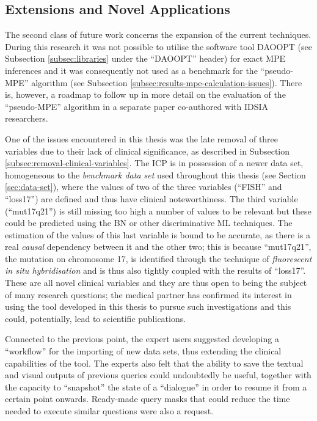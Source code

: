 \subsection{Extensions and Novel Applications}
The second class of future work concerns the expansion of the current techniques.
During this research it was not possible to utilise the software tool DAOOPT (see Subsection \ref{subsec:libraries} under the \enquote{DAOOPT} header) for exact MPE inferences and it was consequently not used as a benchmark for the \enquote{pseudo-MPE} algorithm (see Subsection \ref{subsec:results-mpe-calculation-issues}).
There is, however, a roadmap to follow up in more detail on the evaluation of the \enquote{pseudo-MPE} algorithm in a separate paper co-authored with IDSIA researchers.

One of the issues encountered in this thesis was the late removal of three variables due to their lack of clinical significance, as described in Subsection \ref{subsec:removal-clinical-variables}.
The ICP is in possession of a newer data set, homogeneous to the \textit{benchmark data set} used throughout this thesis (see Section \ref{sec:data-set}), where the values of two of the three variables (\enquote{FISH} and \enquote{loss17}) are defined and thus have clinical noteworthiness.
The third variable (\enquote{mut17q21}) is still missing too high a number of values to be relevant but these could be predicted using the BN or other discriminative ML techniques.
The estimation of the values of this last variable is bound to be accurate, as there is a real \textit{causal} dependency between it and the other two; this is because \enquote{mut17q21}, the mutation on chromosome 17, is identified through the technique of \textit{fluorescent in situ hybridisation} and is thus also tightly coupled with the results of \enquote{loss17}.
These are all novel clinical variables and they are thus open to being the subject of many research questions; the medical partner has confirmed its interest in using the tool developed in this thesis to pursue such investigations and this could, potentially, lead to scientific publications.

Connected to the previous point, the expert users suggested developing a \enquote{workflow} for the importing of new data sets, thus extending the clinical capabilities of the tool.
The experts also felt that the ability to save the textual and visual outputs of previous queries could undoubtedly be useful, together with the capacity to \enquote{snapshot} the state of a \enquote{dialogue} in order to resume it from a certain point onwards.
Ready-made query masks that could reduce the time needed to execute similar questions were also a request.

